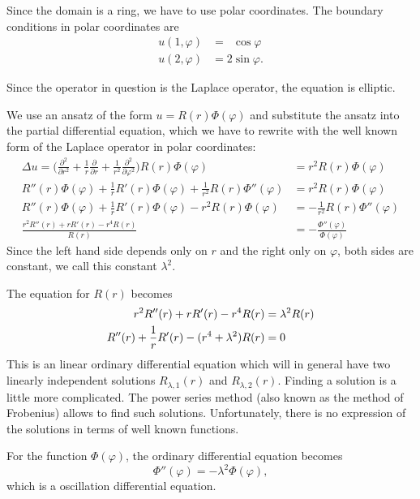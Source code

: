 \begin{loesung}
Since the domain is a ring, we have to use polar coordinates.
The boundary conditions in polar coordinates are 
\[
\begin{aligned}
u(1,\varphi) &= \phantom{2}\cos\varphi\\
u(2,\varphi) &= 2\sin\varphi.
\end{aligned}
\]
\begin{teilaufgaben}
\item
Since the operator in question is the Laplace operator, the equation is
elliptic.
\item
We use an ansatz of the form $u=R(r)\Phi(\varphi)$
and substitute the ansatz into the partial differential equation, which
we have to rewrite with the well known form of the Laplace operator
in polar coordinates:
\begin{align*}
\Delta u
=
\biggl(
\frac{\partial^2}{\partial r^2}
+
\frac1r\frac{\partial}{\partial r}
+
\frac1{r^2}\frac{\partial^2}{\partial\varphi^2}
\biggr)
R(r)\Phi(\varphi)
&=
r^2R(r)\Phi(\varphi)
\\
R''(r)\Phi(\varphi)
+\frac1r R'(r)\Phi(\varphi)
+\frac1{r^2} R(r)\Phi''(\varphi)
&=r^2R(r)\Phi(\varphi)
\\
R''(r)\Phi(\varphi)
+\frac1r R'(r)\Phi(\varphi)
-r^2R(r)\Phi(\varphi)
&=
-\frac1{r^2} R(r)\Phi''(\varphi)
\\
\frac{r^2R''(r)+rR'(r)-r^4R(r)}{R(r)}
&=
-\frac{\Phi''(\varphi)}{\Phi(\varphi)}
\end{align*}
Since the left hand side depends only on $r$ and the right only on $\varphi$,
both sides are constant, we call this constant $\lambda^2$.

The equation for $R(r)$ becomes
\begin{align}
r^2R''(r) + rR'(r) -r^4R(r) &= \lambda^2 R(r)
\notag
\\
R''(r) + \frac1rR'(r) - (r^4+\lambda^2) R(r) &=0
\label{40000024:Rdiff}
\end{align}
This is an linear ordinary differential equation which will in general
have two linearly independent solutions $R_{\lambda,1}(r)$ and
$R_{\lambda,2}(r)$.
Finding a solution is a little more complicated.
The power series method (also known as the method of Frobenius)
allows to find such solutions.
Unfortunately, there is no expression of the solutions in terms of
well known functions.

For the function $\Phi(\varphi)$, the ordinary differential equation becomes
\begin{equation}
\Phi''(\varphi) = -\lambda^2\Phi(\varphi),
\label{40000024:phieqn}
\end{equation}
which is a oscillation differential equation.


\end{teilaufgaben}
\end{loesung}
